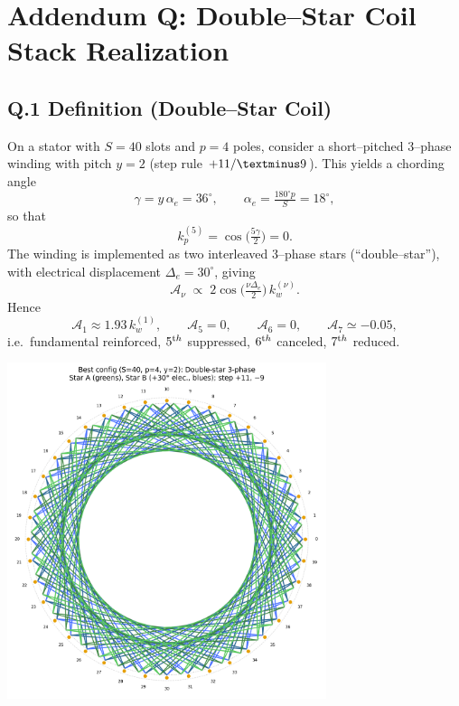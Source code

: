 \documentclass[11pt,a4paper]{article}
\begin{document}
\section*{Addendum Q: Double--Star Coil Stack Realization}
\label{sec:addendumQ}

\subsection*{Q.1 Definition (Double--Star Coil)}
On a stator with $S=40$ slots and $p=4$ poles, consider a short--pitched
3--phase winding with pitch $y=2$ (step rule $+11/\textminus9$).
This yields a chording angle
\[
	\gamma = y\,\alpha_e = 36^\circ,
	\qquad
	\alpha_e = \tfrac{180^\circ p}{S} = 18^\circ,
\]
so that
\[
	k_p^{(5)}=\cos\!\big(\tfrac{5\gamma}{2}\big)=0.
\]
The winding is implemented as two interleaved 3--phase stars (``double--star''),
with electrical displacement $\Delta_e=30^\circ$, giving
\[
	\mathcal A_\nu \;\propto\; 2\cos\!\Big(\tfrac{\nu\Delta_e}{2}\Big)\,k_w^{(\nu)}.
\]
Hence
\[
	\mathcal A_1 \approx 1.93\,k_w^{(1)},\qquad
	\mathcal A_5=0,\qquad
	\mathcal A_6=0,\qquad
	\mathcal A_7\simeq -0.05,
\]
i.e.\ fundamental reinforced, $5^{\textrm th}$ suppressed, $6^{\textrm th}$ canceled,
$7^{\textrm th}$ reduced.

\begin{center}
    \includegraphics[width=0.7\textwidth]{S40_double_star_best}
\end{center}
\end{document}
